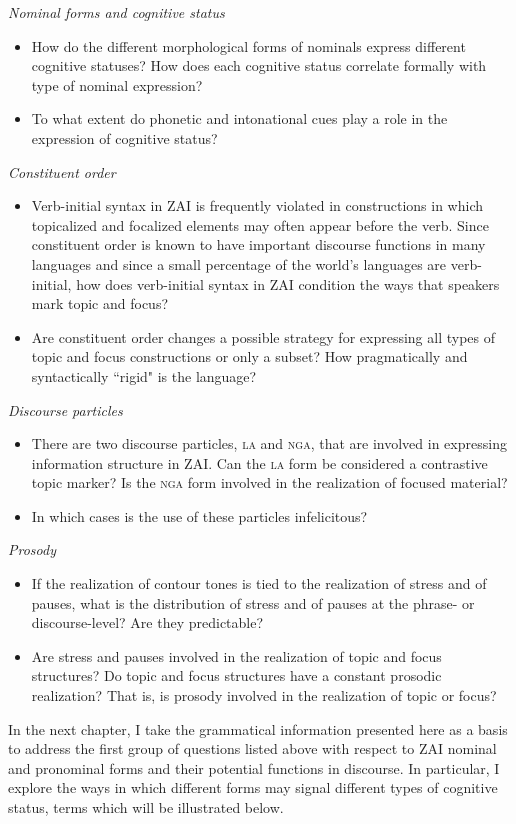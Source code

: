 \singlespacing
\vspace{3mm}
\noindent \textit{Nominal forms and cognitive status}
\begin{itemize}
\item How do the different morphological forms of nominals express different cognitive statuses? How does each cognitive status correlate formally with type of nominal expression?
\item To what extent do phonetic and intonational cues play a role in the expression of cognitive status?
\end{itemize}

\vspace{3mm}
\noindent \textit{Constituent order}
\begin{itemize}
\item Verb-initial syntax in ZAI is frequently violated in constructions in which topicalized and focalized elements may often appear before the verb. Since constituent order is known to have important discourse functions in many languages and since a small percentage of the world's languages are verb-initial, how does verb-initial syntax in ZAI condition the ways that speakers mark topic and focus? 
\item Are constituent order changes a possible strategy for expressing all types of topic and focus constructions or only a subset? How pragmatically and syntactically ``rigid" is the language?
\end{itemize}

\vspace{3mm}
\noindent \textit{Discourse particles}
\begin{itemize}
\item There are two discourse particles, \textsc{la} and \textsc{nga}, that are involved in expressing information structure in ZAI. Can the \textsc{la} form be considered a contrastive topic marker? Is the \textsc{nga} form involved in the realization of focused material? 
\item In which cases is the use of these particles infelicitous?
\end{itemize}

\vspace{3mm}
\noindent \textit{Prosody}
\begin{itemize}
\item If the realization of contour tones is tied to the realization of stress and of pauses, what is the distribution of stress and of pauses at the phrase- or discourse-level? Are they predictable? 
\item Are stress and pauses involved in the realization of topic and focus structures? Do topic and focus structures have a constant prosodic realization? That is, is prosody involved in the realization of topic or focus?
\end{itemize}


In the next chapter, I take the grammatical information presented here as a basis to address the first group of questions listed above with respect to ZAI nominal and pronominal forms and their potential functions in discourse. In particular, I explore the ways in which different forms may signal different types of cognitive status, terms which will be illustrated below. 

